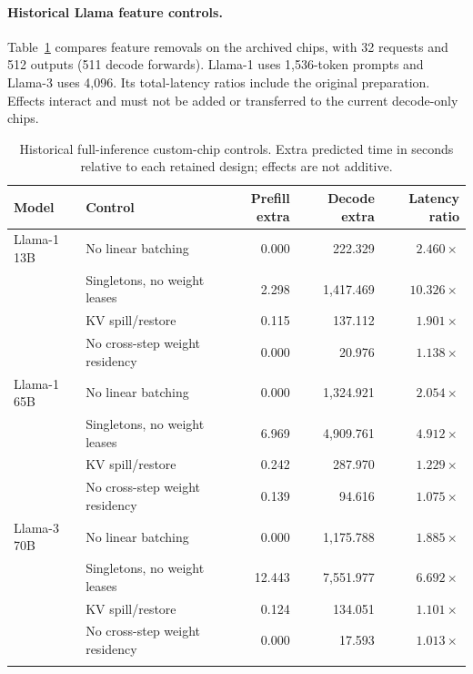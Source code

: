 \paragraph{Historical Llama feature controls.}
Table~\ref{tab:uniform_llama_controls} compares feature removals on the
archived chips, with 32 requests and 512 outputs (511 decode forwards).
Llama-1 uses 1,536-token prompts and Llama-3 uses 4,096. Its total-latency
ratios include the original preparation. Effects interact and must not be
added or transferred to the current decode-only chips.

\begin{table}[t]
\centering\scriptsize
\caption{Historical full-inference custom-chip controls. Extra predicted time in seconds relative to each retained design; effects are not additive.}
\label{tab:uniform_llama_controls}
\begin{tabular}{@{}llrrr@{}}
\toprule
Model & Control & Prefill extra & Decode extra & Latency ratio \\
\midrule
Llama-1 13B & No linear batching & 0.000 & 222.329 & $2.460\times$ \\
 & Singletons, no weight leases & 2.298 & 1,417.469 & $10.326\times$ \\
 & KV spill/restore & 0.115 & 137.112 & $1.901\times$ \\
 & No cross-step weight residency & 0.000 & 20.976 & $1.138\times$ \\
\addlinespace
Llama-1 65B & No linear batching & 0.000 & 1,324.921 & $2.054\times$ \\
 & Singletons, no weight leases & 6.969 & 4,909.761 & $4.912\times$ \\
 & KV spill/restore & 0.242 & 287.970 & $1.229\times$ \\
 & No cross-step weight residency & 0.139 & 94.616 & $1.075\times$ \\
\addlinespace
Llama-3 70B & No linear batching & 0.000 & 1,175.788 & $1.885\times$ \\
 & Singletons, no weight leases & 12.443 & 7,551.977 & $6.692\times$ \\
 & KV spill/restore & 0.124 & 134.051 & $1.101\times$ \\
 & No cross-step weight residency & 0.000 & 17.593 & $1.013\times$ \\
\addlinespace
\bottomrule
\end{tabular}
\end{table}
